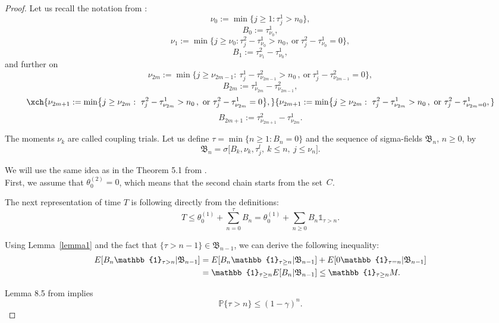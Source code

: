 \documentclass[numbers,compress,v1.0.1]{vmsta}
\theoremstyle{definition}
\begin{document}
\begin{proof}
Let us recall the notation from \cite{Coupling}:
%
\begingroup
\abovedisplayskip=5pt
\belowdisplayskip=5pt
\[
\nu_0 := \min\bigl\{j\ge1: \tau^1_j>n_0
\bigr\},
\]
%
\[
B_0 := \tau^1_{\nu_0},
\]
%
\[
\nu_1 := \min\bigl\{j\ge\nu_0: \tau^2_j-
\tau^1_{\nu_0}>n_0,\ \mbox{or}\ \tau
^2_j - \tau^1_{\nu_0}=0\bigr\},
\]
%
\[
B_1 := \tau^2_{\nu_1} - \tau^1_{\nu_0},
\]
%
and further on
%
\[
\nu_{2m} := \min\bigl\{j\ge\nu_{2m-1}:\ \tau^1_j
- \tau^2_{\nu_{2m-1}}>n_0\, ,\ \mbox{or}\
\tau^1_j - \tau^2_{\nu_{2m-1}}=0\bigr\},
\]
%
\[
B_{2m} := \tau^1_{\nu_{2m}} - \tau^2_{\nu_{2m-1}},
\]
%
\[
\xch{\nu_{2m+1} := \min\bigl\{j\ge\nu_{2m}:\ \tau^2_j - \tau^1_{\nu_{2m}}>n_0\, ,\ \mbox{or}\ \tau^2_j - \tau^1_{\nu_{2m}}=0\bigr\},}{\nu_{2m+1} := \min\bigl\{j\ge\nu_{2m}:\ \tau^2_j - \tau^1_{\nu_{2m}}>n_0\, ,\ \mbox{or}\ \tau^2_j - \tau^1_{\nu_{2m}=0 },}
\]
%
\[
B_{2m+1} := \tau^2_{\nu_{2m+1}} - \tau^1_{\nu_{2m}}.
\]
\endgroup

The moments $\nu_k$ are called coupling trials. Let us define $\tau=
\min\{n\ge1: B_n = 0\}$ and the sequence of sigma-fields
$\mathfrak{B}_n$, $n\ge0$, by
%
\[
\mathfrak{B}_n = \sigma\bigl[B_k,\nu_k,
\tau^l_j,\ k\le n,\ j\le\nu_n\bigr].
\]

We will use the same idea as in the Theorem 5.1 from \cite{Coupling}. \\
First, we assume that $\theta^{(2)}_0 = 0$, which means that the second
chain starts from the set~$C$.

The next representation of time $T$ is following directly from the definitions:
%
\begingroup
\abovedisplayskip=2pt
\belowdisplayskip=2pt
\begin{equation}
\label{T_ineq} T \le\theta^{(1)}_0 + \sum
_{n=0}^\tau B_n = \theta^{(1)}_0
+ \sum_{n\ge0} B_n \mathbb{1}_{\tau> n}.
\end{equation}
\endgroup

Using Lemma~\ref{lemma1} and the fact that $\{\tau> n-1\} \in\mathfrak
{B}_{n-1}$, we can derive the following inequality:
%
\begin{align}
E[B_n \mathbb{1}_{\tau> n} | \mathfrak{B}_{n-1}] &= E[B_n \mathbb{1}_{\tau\ge n} | \mathfrak{B}_{n-1}] + E[0 \mathbb{1}_{\tau= n} | \mathfrak{B}_{n-1}] \notag\\
&= \mathbb{1}_{\tau\ge n} E[B_n | \mathfrak{B}_{n-1}] \le\mathbb{1}_{\tau\ge n} M.\label{ineq1}
\end{align}

Lemma 8.5 from \cite{Coupling} implies
%
\begin{equation}
\mathbb{P}\{\tau> n\} \le(1-\gamma)^{n}.
\end{equation}


\end{proof}
\end{document}
